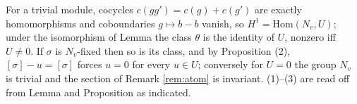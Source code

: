 For a trivial module, cocycles $c(gg') = c(g) + c(g')$ are exactly homomorphisms and coboundaries $g \mapsto b - b$ vanish, so $H^1 = \mathrm{Hom}(N_v, U)$; under the isomorphism of Lemma  the class $\theta$ is the identity of $U$, nonzero iff $U \neq 0$. If $\sigma$ is $N_v$-fixed then so is its class, and by Proposition (2), $[\sigma] - u = [\sigma]$ forces $u = 0$ for every $u \in U$; conversely for $U = 0$ the group $N_v$ is trivial and the section of Remark \ref{rem:atom} is invariant. (1)--(3) are read off from Lemma  and Proposition  as indicated.
